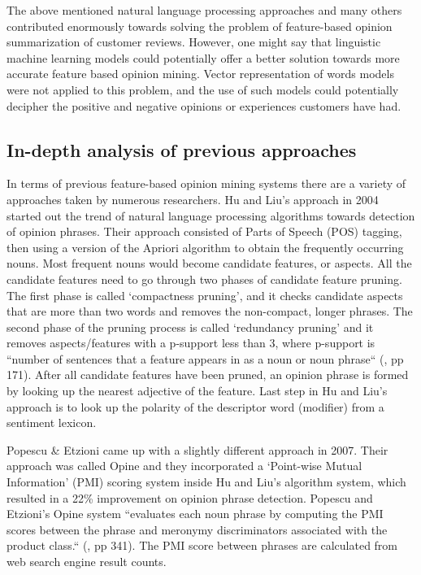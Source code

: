 \documentclass{sig-alternate}
\begin{document}
The above mentioned natural language processing approaches and many others contributed enormously towards solving the problem of feature-based opinion summarization of customer reviews. However, one might say that linguistic machine learning models could potentially offer a better solution towards more accurate feature based opinion mining. Vector representation of words models were not applied to this problem, and the use of such models could potentially decipher the positive and negative opinions or experiences customers have had.

\subsection{In-depth analysis of previous approaches}
In terms of previous feature-based opinion mining systems there are a variety of approaches taken by numerous researchers. Hu and Liu's approach in 2004 started out the trend of natural language processing algorithms towards detection of opinion phrases. Their approach consisted of Parts of Speech (POS) tagging, then using a version of the Apriori algorithm\cite{AgrawalSrikant} to obtain the frequently occurring nouns. Most frequent nouns would become candidate features, or aspects. All the candidate features need to go through two phases of candidate feature pruning. The first phase is called `compactness pruning', and it checks candidate aspects that are more than two words and removes the non-compact, longer phrases. The second phase of the pruning process is called `redundancy pruning' and it removes aspects/features with a p-support less than 3, where p-support is ``number of sentences that a feature appears in as a noun or noun phrase``  (\cite{HuLiu2004}, pp 171). After all candidate features have been pruned, an opinion phrase is formed by looking up the nearest adjective of the feature. Last step in Hu and Liu's approach is to look up the polarity of the descriptor word (modifier) from a sentiment lexicon. 

Popescu \& Etzioni\cite{PopescuEtzioni2007} came up with a slightly different approach in 2007. Their approach was called Opine and they incorporated a `Point-wise Mutual Information' (PMI) scoring system inside Hu and Liu's algorithm system, which resulted in a 22\% improvement on opinion phrase detection. Popescu and Etzioni's Opine system ``evaluates each noun phrase by computing the PMI scores between the phrase and meronymy discriminators associated with the product class.``  (\cite{PopescuEtzioni2007}, pp 341). The PMI score between phrases are calculated from web search engine result counts\cite{Turney2001}. 
\end{document}
